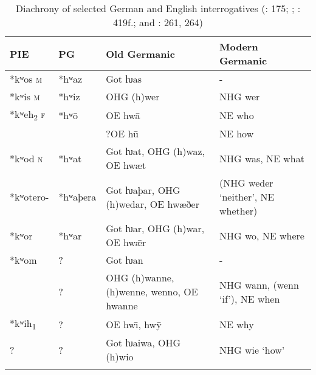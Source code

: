 \begin{table}
\caption{Diachrony of selected German and English interrogatives (\citealt{Hackstein2004}: 175; \citealt{Seebold2002}; \citealt{MalloryAdams2006}: 419f.; and \citealt{Kroonen2013}: 261, 264)}
\label{tab:indo:4}
\small
\begin{tabularx}{\textwidth}{llQl}
\lsptoprule
\textbf{PIE} & \textbf{PG} & \textbf{Old Germanic} & \textbf{Modern Germanic}\\
\midrule
*kʷos \textsc{m} & *hʷaz & Got ƕas & -\\
*kʷis \textsc{m} & *hʷiz & OHG (h)wer & NHG wer\\
*kʷeh\textsubscript{2} \textsc{f} & *hʷ\=o & OE hw\=a & NE who\\
&  & ?OE h\=u & NE how\\
*kʷod \textsc{n} & *hʷat & Got ƕat, OHG (h)waz, OE hwæt & NHG was, NE what\\
*kʷotero- & *hʷaþera & Got ƕaþar, OHG (h)wedar, OE hwæðer & (NHG weder ‘neither’, NE whether)\\
*kʷor & *hʷar & Got ƕar, OHG (h)war, OE hw\={æ}r & NHG wo, NE where\\
*kʷom & ? & Got ƕan & -\\
& ? & OHG (h)wanne, (h)wenne, wenno, OE hwanne & NHG wann, (wenn ‘if’), NE when\\
*kʷih\textsubscript{1} & ? & OE hw\={\i}, hw\={y} & NE why\\
? & ? & Got ƕaiwa, OHG (h)wio & NHG wie ‘how’\\
\lspbottomrule
\end{tabularx}
\end{table}

